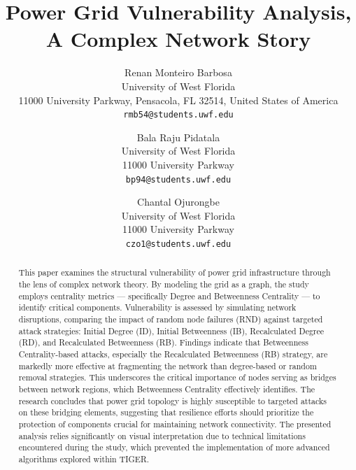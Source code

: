 \documentclass[10pt,twocolumn,letterpaper]{article}
\begin{document}
\title{Power Grid Vulnerability Analysis, A Complex Network Story}

\author{Renan Monteiro Barbosa\\
University of West Florida\\
11000 University Parkway, Pensacola, FL 32514, United States of America \\
{\tt\small rmb54@students.uwf.edu}
\and
Bala Raju Pidatala\\
University of West Florida\\
11000 University Parkway\\
{\tt\small bp94@students.uwf.edu}
\and
Chantal Ojurongbe\\
University of West Florida\\
11000 University Parkway\\
{\tt\small czo1@students.uwf.edu}
}
\maketitle

\begin{abstract}
    This paper examines the structural vulnerability of power grid infrastructure through the lens of complex network theory. By modeling the grid as a graph, the study employs centrality metrics — specifically Degree and Betweenness Centrality — to identify critical components. Vulnerability is assessed by simulating network disruptions, comparing the impact of random node failures (RND) against targeted attack strategies: Initial Degree (ID), Initial Betweenness (IB), Recalculated Degree (RD), and Recalculated Betweenness (RB). Findings indicate that Betweenness Centrality-based attacks, especially the Recalculated Betweenness (RB) strategy, are markedly more effective at fragmenting the network than degree-based or random removal strategies. This underscores the critical importance of nodes serving as bridges between network regions, which Betweenness Centrality effectively identifies. The research concludes that power grid topology is highly susceptible to targeted attacks on these bridging elements, suggesting that resilience efforts should prioritize the protection of components crucial for maintaining network connectivity. The presented analysis relies significantly on visual interpretation due to technical limitations encountered during the study, which prevented the implementation of more advanced algorithms explored within TIGER.
\end{abstract}
\end{document}
